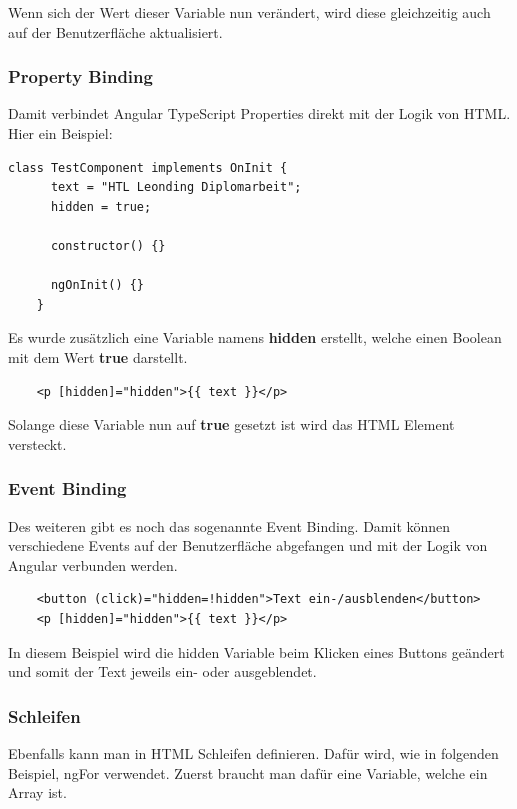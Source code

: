 Wenn sich der Wert dieser Variable nun verändert, wird diese gleichzeitig auch auf der Benutzerfläche aktualisiert. 

\subsubsection{Property Binding}
Damit verbindet Angular TypeScript Properties direkt mit der Logik von HTML. Hier ein Beispiel:

\begin{lstlisting}[caption=Angular Variablen Initalisierung]
    class TestComponent implements OnInit {
      text = "HTL Leonding Diplomarbeit";
      hidden = true;
    
      constructor() {}
    
      ngOnInit() {}
    }
\end{lstlisting}

Es wurde zusätzlich eine Variable namens \textbf{hidden} erstellt, welche einen Boolean mit dem Wert \textbf{true} darstellt.

\begin{lstlisting}
    <p [hidden]="hidden">{{ text }}</p>
\end{lstlisting}

Solange diese Variable nun auf \textbf{true} gesetzt ist wird das HTML Element versteckt.

\subsubsection{Event Binding}
Des weiteren gibt es noch das sogenannte Event Binding. Damit können verschiedene Events auf der Benutzerfläche abgefangen und mit der Logik von Angular verbunden werden.

\begin{lstlisting}
    <button (click)="hidden=!hidden">Text ein-/ausblenden</button>
    <p [hidden]="hidden">{{ text }}</p>
\end{lstlisting}

In diesem Beispiel wird die hidden Variable beim Klicken eines Buttons geändert und somit der Text jeweils ein- oder ausgeblendet.

\subsubsection{Schleifen}
Ebenfalls kann man in HTML Schleifen definieren. Dafür wird, wie in folgenden Beispiel, ngFor verwendet.
Zuerst braucht man dafür eine Variable, welche ein Array ist.

